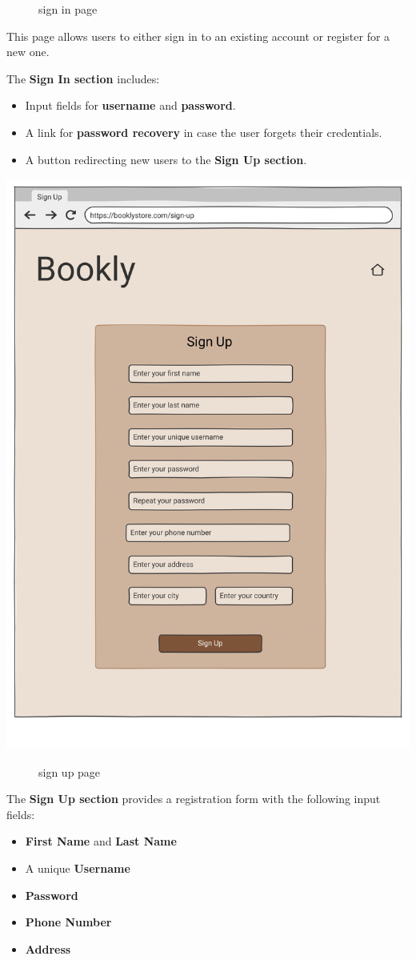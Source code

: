 \begin{figure}[h!]
    \centering
    \caption{sign in page}
    \label{fig:enter-label}
\end{figure}

\label{sec:signin}
This page allows users to either sign in to an existing account or register for a new one.

The \textbf{Sign In section} includes:
\begin{itemize}
    \item Input fields for \textbf{username} and \textbf{password}.
    \item A link for \textbf{password recovery} in case the user forgets their credentials.
    \item A button redirecting new users to the \textbf{Sign Up section}.
\end{itemize}

\includegraphics[width=0.6\linewidth]{HW1Report/photos/signup.png}

\begin{figure}[h!]
    \centering
    \caption{sign up page}
    \label{fig:enter-label}
\end{figure}
The \textbf{Sign Up section} provides a registration form with the following input fields:
\begin{itemize}
    \item \textbf{First Name} and \textbf{Last Name}
    \item A unique \textbf{Username}
    \item \textbf{Password}
    \item \textbf{Phone Number}
    \item \textbf{Address}
\end{itemize}


